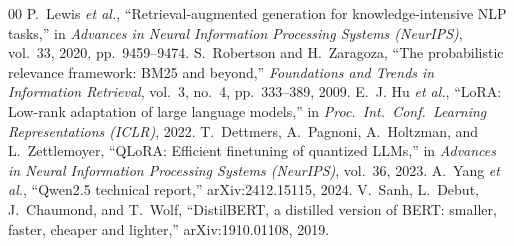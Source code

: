 \documentclass[conference]{IEEEtran}
\begin{document}
\begin{thebibliography}{00}
 P.~Lewis \textit{et al.}, ``Retrieval-augmented generation for knowledge-intensive NLP tasks,'' in \textit{Advances in Neural Information Processing Systems (NeurIPS)}, vol.~33, 2020, pp.~9459--9474.
 S.~Robertson and H.~Zaragoza, ``The probabilistic relevance framework: BM25 and beyond,'' \textit{Foundations and Trends in Information Retrieval}, vol.~3, no.~4, pp.~333--389, 2009.
 E.~J. Hu \textit{et al.}, ``LoRA: Low-rank adaptation of large language models,'' in \textit{Proc.\ Int.\ Conf.\ Learning Representations (ICLR)}, 2022.
 T.~Dettmers, A.~Pagnoni, A.~Holtzman, and L.~Zettlemoyer, ``QLoRA: Efficient finetuning of quantized LLMs,'' in \textit{Advances in Neural Information Processing Systems (NeurIPS)}, vol.~36, 2023.
 A.~Yang \textit{et al.}, ``Qwen2.5 technical report,'' arXiv:2412.15115, 2024.
 V.~Sanh, L.~Debut, J.~Chaumond, and T.~Wolf, ``DistilBERT, a distilled version of BERT: smaller, faster, cheaper and lighter,'' arXiv:1910.01108, 2019.
\end{thebibliography}
\end{document}
